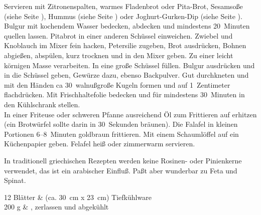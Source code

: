 
      \begin{zubereitung}
        Servieren mit Zitronenspalten, warmes Fladenbrot oder Pita-Brot,
	Sesamsoße (siehe Seite \pageref{sesamsosse}), Hummus (siehe Seite
	\pageref{hummus}) oder Joghurt-Gurken-Dip (siehe Seite
	\pageref{tzatziki}). \\
	Bulgur mit kochendem Wasser bedecken, abdecken und mindestens
	20~Minuten quellen lassen. Pitabrot in einer anderen Schüssel
	einweichen. Zwiebel und Knoblauch im Mixer fein hacken, Petersilie
	zugeben, Brot ausdrücken, Bohnen abgießen, abspülen, kurz trocknen und
	in den Mixer geben. Zu einer leicht körnigen Masse verarbeiten. In eine
	große Schüssel füllen. Bulgur ausdrücken und in die Schüssel geben,
	Gewürze dazu, ebenso Backpulver. Gut durchkneten und mit den Händen
	ca 30~walnußgroße Kugeln formen und auf 1~Zentimeter flachdrücken.
	Mit Frischhaltefolie bedecken und für mindestens 30~Minuten in den
	Kühlschrank stellen. \\
	In einer Friteuse oder schweren Pfanne ausreichend Öl zum Frittieren
	auf  erhitzen (ein Brotwürfel sollte darin in 30~Sekunden
	bräunen). Die Falafel in kleinen Portionen 6--8~Minuten goldbraun
	frittieren. Mit einem Schaumlöffel auf ein Küchenpapier geben.
	Felafel heiß oder zimmerwarm servieren. \\
      \end{zubereitung}


      \begin{einleitung}
        In traditionell griechischen Rezepten werden keine Rosinen- oder
	Pinienkerne verwendet, das ist ein arabischer Einfluß. Paßt aber
	wunderbar zu Feta und Spinat. \\
      \end{einleitung}

      \begin{zutaten}
        12 Blätter &  (ca. 30~cm x 23~cm) Tiefkühlware \\
	200 g & , zerlassen und abgekühlt \\
      \end{zutaten}

